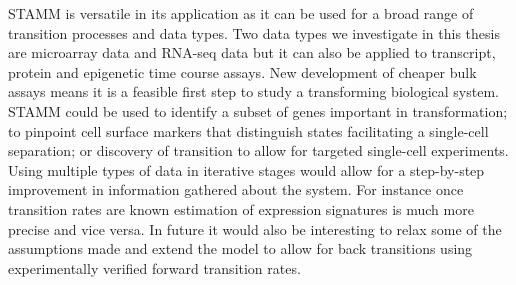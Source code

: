 STAMM is versatile in its application as it can be used for a broad range of transition processes and data types. Two data types we investigate in this thesis are microarray data and RNA-seq data but it can also be applied to transcript, protein and epigenetic time course assays. New development of cheaper bulk assays means it is a feasible first step to study a transforming biological system. STAMM could be used to identify a subset of genes important in transformation; to pinpoint cell surface markers that distinguish states facilitating a single-cell separation; or discovery of transition to allow for targeted single-cell experiments. Using multiple types of data in iterative stages would allow for a step-by-step improvement in information gathered about the system. For instance once transition rates are known estimation of expression signatures is much more precise and vice versa. In future it would also be interesting to relax some of the assumptions made and extend the model to allow for back transitions using experimentally verified forward transition rates.


